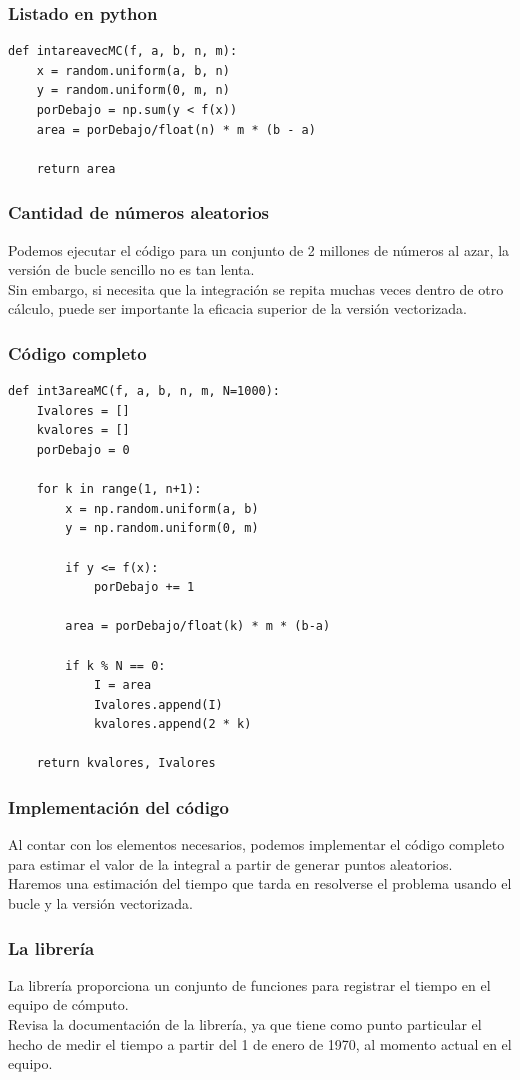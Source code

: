 \documentclass[12pt]{beamer}
\begin{document}
\begin{frame}
\frametitle{Listado en python}
\begin{lstlisting}[caption=Método del dardo en modo vectorizado]
def intareavecMC(f, a, b, n, m):
    x = random.uniform(a, b, n)
    y = random.uniform(0, m, n)
    porDebajo = np.sum(y < f(x))
    area = porDebajo/float(n) * m * (b - a)
    
    return area
\end{lstlisting}
\end{frame}
\begin{frame}
\frametitle{Cantidad de números aleatorios}
Podemos ejecutar el código para un conjunto de 2 millones de números al azar, la versión de bucle sencillo no es tan lenta.
\\
\bigskip
\pause
Sin embargo, si necesita que la integración se repita muchas veces dentro de otro cálculo, puede ser importante la eficacia superior de la versión vectorizada.
\end{frame}
\begin{frame}
\frametitle{Código completo}
\begin{lstlisting}[caption=Función para el método del dardo]
def int3areaMC(f, a, b, n, m, N=1000):
    Ivalores = []
    kvalores = []
    porDebajo = 0
    
    for k in range(1, n+1):
        x = np.random.uniform(a, b)
        y = np.random.uniform(0, m)
        
        if y <= f(x):
            porDebajo += 1
        
        area = porDebajo/float(k) * m * (b-a)
        
        if k % N == 0:
            I = area
            Ivalores.append(I)
            kvalores.append(2 * k)
    
    return kvalores, Ivalores
\end{lstlisting}
\end{frame}
\begin{frame}
\frametitle{Implementación del código}
Al contar con los elementos necesarios, podemos implementar el código completo para estimar el valor de la integral a partir de generar puntos aleatorios.
\\
\bigskip
\pause
Haremos una estimación del tiempo que tarda en resolverse el problema usando el bucle y la versión vectorizada.
\end{frame}
\begin{frame}
\frametitle{La librería }
La librería  proporciona un conjunto de funciones para registrar el tiempo en el equipo de cómputo.
\\
\bigskip
\pause
Revisa la documentación de la librería, ya que tiene como punto particular el hecho de medir el tiempo a partir del 1 de enero de 1970, al momento actual en el equipo.
\end{frame}
\end{document}
